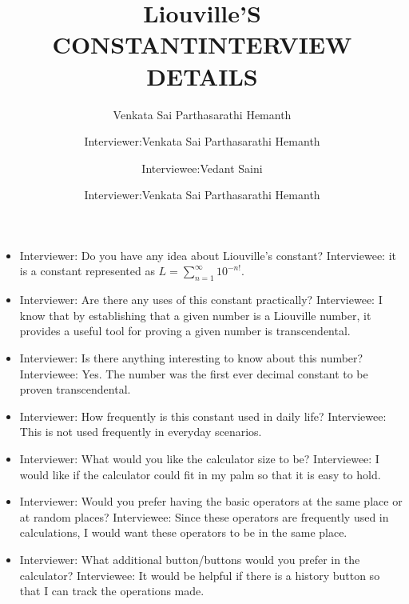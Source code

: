 \documentclass{article}
\title{Liouville'S CONSTANT}
\author{Venkata Sai Parthasarathi Hemanth }
\date{Interviewer:Venkata Sai Parthasarathi Hemanth}
\title{INTERVIEW DETAILS}
\author{Interviewer:Venkata Sai Parthasarathi Hemanth}
\author{Interviewee:Vedant Saini}
\begin{document}
\maketitle
\begin{itemize}
\item
Interviewer: Do you have any idea about Liouville’s constant?\newline
Interviewee: it is a constant represented as 
$L=\sum_{n=1}^{\infty} 10^{-n!}$.\newline
\item
Interviewer: Are there any uses of this constant practically?\newline
Interviewee: I know that by establishing that a given number is a Liouville number, it provides a useful tool for proving a given number is transcendental. \newline
\item
Interviewer: Is there anything interesting to know about this number?\newline
Interviewee: Yes. The number was the first ever decimal constant to be proven transcendental.\newline
\item
Interviewer: How frequently is this constant used in daily life? \newline
Interviewee: This is not used frequently in everyday scenarios.\newline
\item
Interviewer: What would you like the calculator size to be?\newline
Interviewee: I would like if the calculator could fit in my palm so that it is easy to hold.\newline
\item
Interviewer: Would you prefer having the basic operators at the same place or at random places?\newline
Interviewee: Since these operators are frequently used in calculations, I would want these operators to be in the same place. \newline
\item
 Interviewer: What additional button/buttons would you prefer in the calculator?\newline
 Interviewee: It would be helpful if there is a history button so that I can track the operations made.\newline


\end{itemize}
\end{document}
